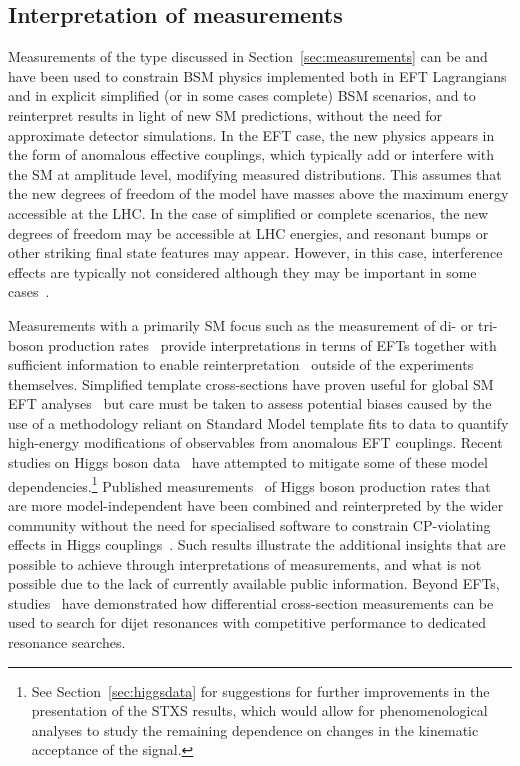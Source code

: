 \documentclass[a4paper,aps,prd,longbibliography,notitlepage,showpacs,amsmath,amssymb,superscriptaddress,nofootinbib,floatfix,11pt,preprintnumbers]{revtex4-1-mod}
\begin{document}
\subsection{Interpretation of measurements}
\label{sec:measint}
Measurements of the type discussed in Section~\ref{sec:measurements} can be and have been used to constrain BSM physics implemented both in EFT Lagrangians and in explicit simplified (or in some cases complete) BSM scenarios, and to reinterpret results in light of new SM predictions, without the need for approximate detector simulations.
In the EFT case, the new physics appears in the form of anomalous effective couplings, which typically add or interfere with the SM at
amplitude level, modifying measured distributions. This assumes that the new degrees of freedom of the model have masses above the
maximum energy accessible at the LHC. In the case of simplified or complete scenarios, the new degrees of freedom may be accessible at LHC energies, and
resonant bumps or other striking final state features may appear. However, in this case, interference effects are typically not considered although they may be important in some cases~\cite{Kahlhoefer:2019vhz}.

Measurements with a primarily SM focus such as the measurement of di- or tri-boson production rates~\cite{Khachatryan:2015sga,Aad:2016ett,Aaboud:2016ftt} provide interpretations in terms of EFTs together with sufficient information to enable reinterpretation~\cite{Ellis:2014jta,Falkowski:2016cxu,Butter:2016cvz} outside of the experiments themselves. Simplified template cross-sections have proven useful for global SM EFT analyses~\cite{Biekotter:2018rhp} but care must be taken to assess potential biases caused by the use of a methodology reliant on Standard Model template fits to data to quantify high-energy modifications of observables from anomalous EFT couplings. Recent studies on Higgs boson data~\cite{ATL-PHYS-PUB-2019-042} have attempted to mitigate some of these model dependencies.\footnote{See Section~\ref{sec:higgsdata} for suggestions for further improvements in the presentation of the STXS results, which would allow for phenomenological analyses to study the remaining dependence on changes in the kinematic acceptance of the signal.}
Published measurements~\cite{Aaboud:2018xdt,Aaboud:2017oem} of Higgs boson production rates that are more model-independent have been combined and reinterpreted by the wider community without the need for specialised software to constrain CP-violating effects in Higgs couplings~\cite{Bernlochner:2018opw}. Such results illustrate the additional insights that are possible to achieve through interpretations of measurements, and what is not possible due to the lack of currently available public information.
Beyond EFTs, studies~\cite{Aad:2013tea} have demonstrated how differential cross-section measurements can be used to search for dijet resonances with competitive performance to dedicated resonance searches.
\end{document}
